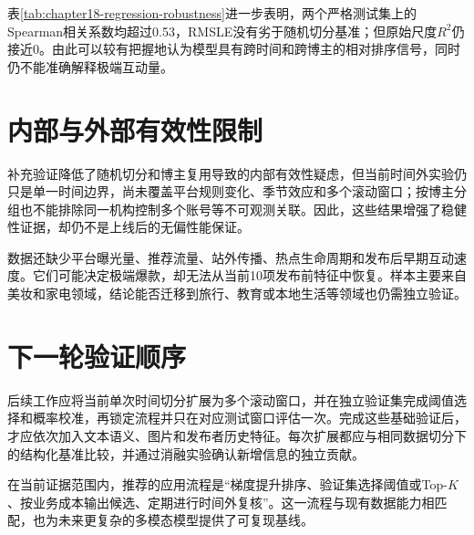 表\ref{tab:chapter18-regression-robustness}进一步表明，两个严格测试集上的Spearman相关系数均超过0.53，RMSLE没有劣于随机切分基准；但原始尺度$R^2$仍接近0。由此可以较有把握地认为模型具有跨时间和跨博主的相对排序信号，同时仍不能准确解释极端互动量。

\section{内部与外部有效性限制}
补充验证降低了随机切分和博主复用导致的内部有效性疑虑，但当前时间外实验仍只是单一时间边界，尚未覆盖平台规则变化、季节效应和多个滚动窗口；按博主分组也不能排除同一机构控制多个账号等不可观测关联。因此，这些结果增强了稳健性证据，却仍不是上线后的无偏性能保证。

数据还缺少平台曝光量、推荐流量、站外传播、热点生命周期和发布后早期互动速度。它们可能决定极端爆款，却无法从当前10项发布前特征中恢复。样本主要来自美妆和家电领域，结论能否迁移到旅行、教育或本地生活等领域也仍需独立验证。

\section{下一轮验证顺序}
后续工作应将当前单次时间切分扩展为多个滚动窗口，并在独立验证集完成阈值选择和概率校准，再锁定流程并只在对应测试窗口评估一次。完成这些基础验证后，才应依次加入文本语义、图片和发布者历史特征。每次扩展都应与相同数据切分下的结构化基准比较，并通过消融实验确认新增信息的独立贡献。

在当前证据范围内，推荐的应用流程是“梯度提升排序、验证集选择阈值或Top-$K$、按业务成本输出候选、定期进行时间外复核”。这一流程与现有数据能力相匹配，也为未来更复杂的多模态模型提供了可复现基线。
